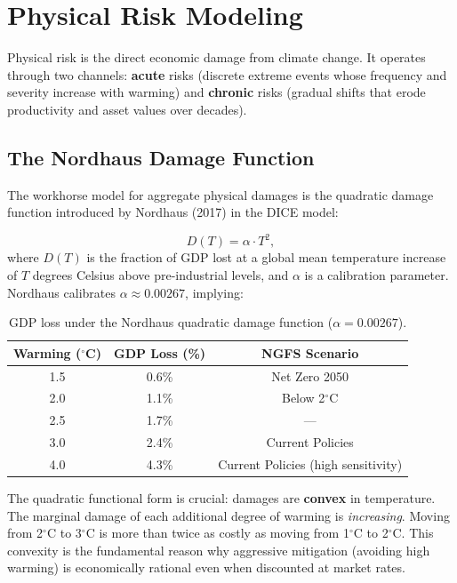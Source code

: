 \documentclass[11pt, a4paper]{article}
\theoremstyle{definition}
\theoremstyle{plain}
\theoremstyle{remark}
\begin{document}
\section{Physical Risk Modeling}
\label{sec:physical-risk}

Physical risk is the direct economic damage from climate change.
It operates through two channels: \textbf{acute} risks (discrete extreme events
whose frequency and severity increase with warming) and \textbf{chronic} risks
(gradual shifts that erode productivity and asset values over decades).

\subsection{The Nordhaus Damage Function}

The workhorse model for aggregate physical damages is the quadratic damage
function introduced by Nordhaus (2017) in the DICE model:

\begin{equation}\label{eq:nordhaus-damage}
    D(T) = \alpha \cdot T^2,
\end{equation}
where $D(T)$ is the fraction of GDP lost at a global mean temperature increase
of $T$ degrees Celsius above pre-industrial levels, and $\alpha$ is a calibration
parameter.
Nordhaus calibrates $\alpha \approx 0.00267$, implying:

\begin{table}[H]
\centering
\caption{GDP loss under the Nordhaus quadratic damage function
($\alpha = 0.00267$).}
\label{tab:damage-function}
\begin{tabular}{@{}ccc@{}}
\toprule
\textbf{Warming ($^\circ$C)} & \textbf{GDP Loss (\%)} & \textbf{NGFS Scenario} \\
\midrule
1.5 & 0.6\% & Net Zero 2050 \\
2.0 & 1.1\% & Below 2$^\circ$C \\
2.5 & 1.7\% & --- \\
3.0 & 2.4\% & Current Policies \\
4.0 & 4.3\% & Current Policies (high sensitivity) \\
\bottomrule
\end{tabular}
\end{table}

\begin{keyidea}
The quadratic functional form is crucial: damages are \textbf{convex} in
temperature.
The marginal damage of each additional degree of warming is \emph{increasing}.
Moving from 2$^\circ$C to 3$^\circ$C is more than twice as costly as moving
from 1$^\circ$C to 2$^\circ$C.
This convexity is the fundamental reason why aggressive mitigation (avoiding
high warming) is economically rational even when discounted at market rates.
\end{keyidea}
\end{document}
